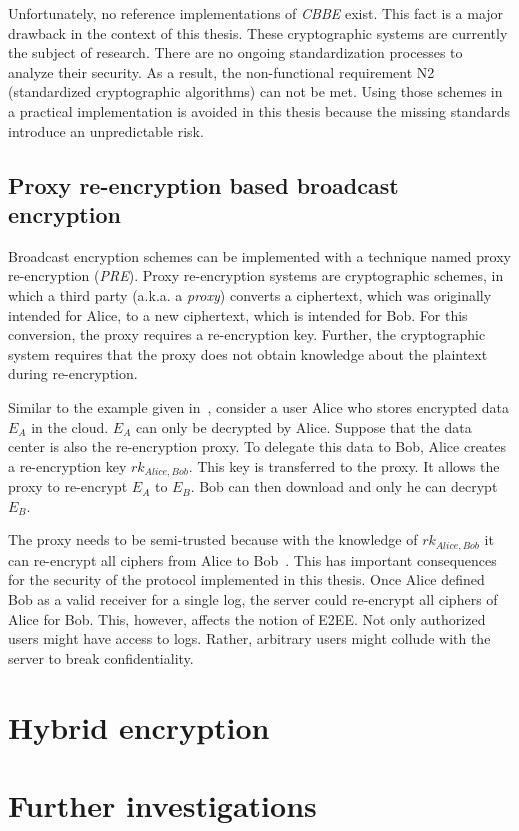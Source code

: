 \documentclass[../main.tex]{subfiles}
\begin{document}
Unfortunately, no reference implementations of \textit{CBBE} exist. 
This fact is a major drawback in the context of this thesis.
These cryptographic systems are currently the subject of research.
There are no ongoing standardization processes to analyze their security.
As a result, the non-functional requirement N2 (standardized cryptographic algorithms) can not be met.
Using those schemes in a practical implementation is avoided in this thesis because the missing standards introduce an unpredictable risk.

\subsection{Proxy re-encryption based broadcast encryption}
Broadcast encryption schemes can be implemented with a technique named proxy re-encryption (\textit{PRE}).
Proxy re-encryption systems are cryptographic schemes, in which a third party (a.k.a. a \textit{proxy}) converts a ciphertext, which was originally intended for Alice, to a new ciphertext, which is intended for Bob. 
For this conversion, the proxy requires a re-encryption key. 
Further, the cryptographic system requires that the proxy does not obtain knowledge about the plaintext during re-encryption.~\cite{Chen2018}

Similar to the example given in~\cite{Chen2018}, consider a user Alice who stores encrypted data $E_A$ in the cloud.
$E_A$ can only be decrypted by Alice.
Suppose that the data center is also the re-encryption proxy.
To delegate this data to Bob, Alice creates a re-encryption key $rk_{Alice,Bob}$. 
This key is transferred to the proxy.
It allows the proxy to re-encrypt $E_A$ to $E_B$.
Bob can then download and only he can decrypt $E_B$.

The proxy needs to be semi-trusted because with the knowledge of $rk_{Alice,Bob}$ it can re-encrypt all ciphers from Alice to Bob~\cite{Chen2018}.
This has important consequences for the security of the protocol implemented in this thesis.
Once Alice defined Bob as a valid receiver for a single log, the server could re-encrypt all ciphers of Alice for Bob.
This, however, affects the notion of E2EE.
Not only authorized users might have access to logs.
Rather, arbitrary users might collude with the server to break confidentiality.
\section{Hybrid encryption}

\section{Further investigations}
\end{document}
